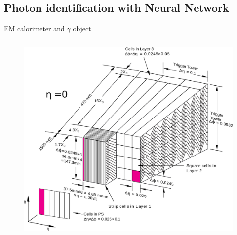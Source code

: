 
\subsection{Photon identification with Neural Network}
\begin{frame}{EM calorimeter and $\gamma$ object}
\begin{columns}
\begin{figure}
    \centering
    \includegraphics[width=1.\textwidth]{Part6/Img/EM.png}
\end{figure}


\end{columns}
\end{frame}
